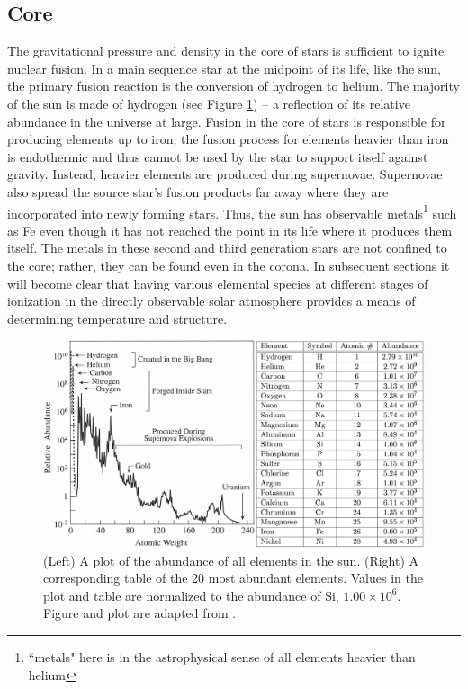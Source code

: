 \subsection{Core}
The gravitational pressure and density in the core of stars is sufficient to ignite nuclear fusion. In a main sequence star at the midpoint of its life, like the sun, the primary fusion reaction is the conversion of hydrogen to helium. The majority of the sun is made of hydrogen (see Figure \ref{fig:sunabundance}) -- a reflection of its relative abundance in the universe at large. Fusion in the core of stars is responsible for producing elements up to iron; the fusion process for elements heavier than iron is endothermic and thus cannot be used by the star to support itself against gravity. Instead, heavier elements are produced during supernovae. Supernovae also spread the source star's fusion products far away where they are incorporated into newly forming stars. Thus, the sun has observable metals\footnote{``metals" here is in the astrophysical sense of all elements heavier than helium} such as Fe even though it has not reached the point in its life where it produces them itself. The metals in these second and third generation stars are not confined to the core; rather, they can be found even in the corona. In subsequent sections it will become clear that having various elemental species at different stages of ionization in the directly observable solar atmosphere provides a means of determining temperature and structure. 

\begin{figure}[!h]
    \begin{center}
	    \includegraphics[width=\textwidth]{Images/SolarAbundance.png}
    \end{center}
    \caption[Solar elemental abundances]{
        (Left) A plot of the abundance of all elements in the sun. (Right) A corresponding table of the 20 most 
        abundant elements. Values in the plot and table are normalized to the abundance of Si, $1.00 \times 10^6$. 
        Figure and plot are adapted from \citet{Lang2001}.       
    }
    \label{fig:sunabundance}
\end{figure}

